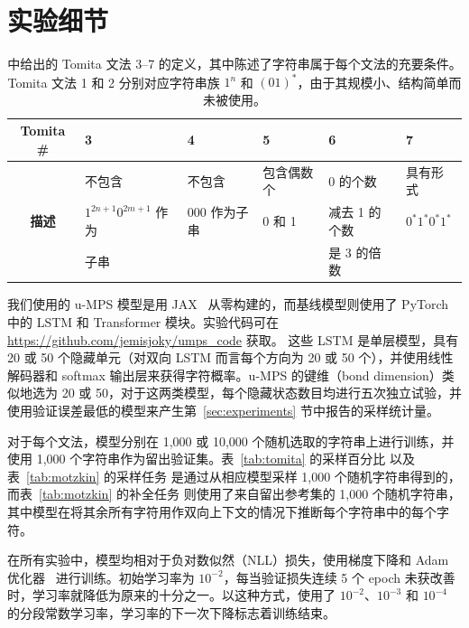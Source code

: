 \section{实验细节}
\label{sec:appendix_d}

\begin{table}[h]
\caption{\citep{bengio1994} 中给出的 Tomita 文法 3--7 的定义，其中陈述了字符串属于每个文法的充要条件。Tomita 文法 1 和 2 分别对应字符串族 $1^n$ 和 $(01)^*$，由于其规模小、结构简单而未被使用。}
\label{tab:tomita_def}
\begin{center}
\begin{small}
\begin{tabular}{c|lllll}
    \textbf{Tomita \#} & 3 & 4 & 5 & 6 & 7 \\
    \midrule
    \multirow{3}{*}{\textbf{描述}} & 不包含                 & 不包含               & 包含偶数个      & 0 的个数           & 具有形式 \\
                                  & $1^{2n+1}0^{2m+1}$ 作为 & $000$ 作为子串       & 0 和 1        & 减去 1 的个数        & $0^*1^*0^*1^*$ \\
                                  & 子串                   &                      &               & 是 3 的倍数          &
\end{tabular}
\end{small}
\end{center}
\end{table}

我们使用的 u-MPS 模型是用 JAX~\citep{jax2018} 从零构建的，而基线模型则使用了 PyTorch~\citep{paszke2017} 中的 LSTM 和 Transformer 模块。实验代码可在 \url{https://github.com/jemisjoky/umps_code} 获取。
这些 LSTM 是单层模型，具有 20 或 50 个隐藏单元（对双向 LSTM 而言每个方向为 20 或 50 个），并使用线性解码器和 softmax 输出层来获得字符概率。u-MPS 的键维（bond dimension）类似地选为 20 或 50，对于这两类模型，每个隐藏状态数目均进行五次独立试验，并使用验证误差最低的模型来产生第~\ref{sec:experiments} 节中报告的采样统计量。

对于每个文法，模型分别在 1,000 或 10,000 个随机选取的字符串上进行训练，并使用 1,000 个字符串作为留出验证集。表~\ref{tab:tomita} 的采样百分比
以及表~\ref{tab:motzkin} 的采样任务
是通过从相应模型采样 1,000 个随机字符串得到的，而表~\ref{tab:motzkin} 的补全任务
则使用了来自留出参考集的 1,000 个随机字符串，其中模型在将其余所有字符用作双向上下文的情况下推断每个字符串中的每个字符。

在所有实验中，模型均相对于负对数似然（NLL）损失，使用梯度下降和 Adam 优化器~\citep{kingma2015} 进行训练。初始学习率为 $10^{-2}$，每当验证损失连续 5 个 epoch 未获改善时，学习率就降低为原来的十分之一。以这种方式，使用了 $10^{-2}$、$10^{-3}$ 和 $10^{-4}$ 的分段常数学习率，学习率的下一次下降标志着训练结束。

